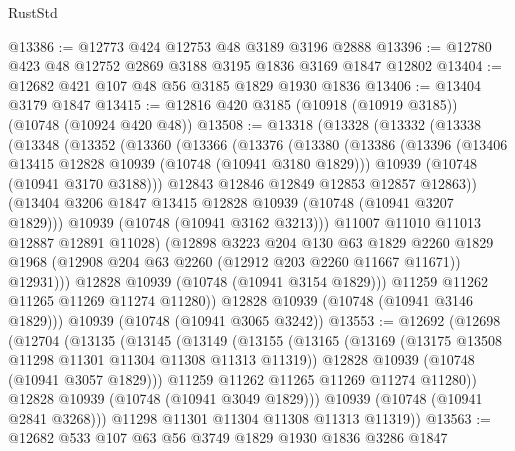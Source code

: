 \begin{lexlean}{RustStd}
\begin{coremodule}
@13386 := @12773 @424 @12753 @48 @3189 @3196 @2888
@13396 := @12780 @423 @48 @12752 @2869 @3188 @3195 @1836 @3169 @1847 @12802
@13404 := @12682 @421 @107 @48 @56 @3185 @1829 @1930 @1836
@13406 := @13404 @3179 @1847
@13415 := @12816 @420 @3185 (@10918 (@10919 @3185)) (@10748 (@10924 @420 @48))
@13508 := @13318
    (@13328
      (@13332
        (@13338
          (@13348
            (@13352
              (@13360
                (@13366
                  (@13376
                    (@13380
                      (@13386
                        (@13396
                          (@13406 @13415 @12828 @10939 (@10748 (@10941 @3180 @1829)))
                          @10939
                          (@10748 (@10941 @3170 @3188)))
                        @12843
                        @12846
                        @12849
                        @12853
                        @12857
                        @12863))
                    (@13404 @3206 @1847 @13415 @12828 @10939 (@10748 (@10941 @3207 @1829)))
                    @10939
                    (@10748 (@10941 @3162 @3213)))
                  @11007
                  @11010
                  @11013
                  @12887
                  @12891
                  @11028)
                (@12898
                  @3223
                  @204
                  @130
                  @63
                  @1829
                  @2260
                  @1829
                  @1968
                  (@12908 @204 @63 @2260 (@12912 @203 @2260 @11667 @11671))
                  @12931)))
            @12828
            @10939
            (@10748 (@10941 @3154 @1829)))
          @11259
          @11262
          @11265
          @11269
          @11274
          @11280))
      @12828
      @10939
      (@10748 (@10941 @3146 @1829)))
    @10939
    (@10748 (@10941 @3065 @3242))
@13553 := @12692
    (@12698
      (@12704
        (@13135
          (@13145
            (@13149
              (@13155
                (@13165
                  (@13169 (@13175 @13508 @11298 @11301 @11304 @11308 @11313 @11319))
                  @12828
                  @10939
                  (@10748 (@10941 @3057 @1829)))
                @11259
                @11262
                @11265
                @11269
                @11274
                @11280))
            @12828
            @10939
            (@10748 (@10941 @3049 @1829)))
          @10939
          (@10748 (@10941 @2841 @3268)))
        @11298
        @11301
        @11304
        @11308
        @11313
        @11319))
@13563 := @12682 @533 @107 @63 @56 @3749 @1829 @1930 @1836 @3286 @1847

\end{coremodule}
\end{lexlean}
